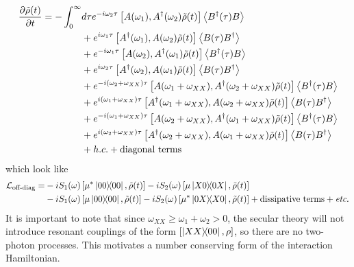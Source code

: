 \documentclass[]{article}
\begin{document}
\begin{align}
	\pdv{\tilde{\rho}(t)}{t} = - \int_{0}^{\infty}& d\tau e^{-i\omega_2 \tau} \left[A(\omega_1), A^{\dagger}(\omega_2)\tilde{\rho}(t)\right] \expval{B^{\dagger}(\tau)B} \\
	&+ e^{i\omega_1\tau} \left[A^{\dagger}(\omega_1), A(\omega_2)\tilde{\rho}(t)\right] \expval{B(\tau)B^{\dagger}} \\
	& + e^{-i\omega_1 \tau} \left[A(\omega_2), A^{\dagger}(\omega_1)\tilde{\rho}(t)\right] \expval{B^{\dagger}(\tau)B} \\
	&+ e^{i\omega_2\tau} \left[A^{\dagger}(\omega_2), A(\omega_1)\tilde{\rho}(t)\right] \expval{B(\tau)B^{\dagger}} \\
	& + e^{-i(\omega_2 +\omega_{XX} )\tau} \left[A(\omega_1 +\omega_{XX}), A^{\dagger}(\omega_2 +\omega_{XX})\tilde{\rho}(t)\right] \expval{B^{\dagger}(\tau)B} \\
	&+ e^{i(\omega_1 +\omega_{XX} )\tau} \left[A^{\dagger}(\omega_1 +\omega_{XX}), A(\omega_2 +\omega_{XX})\tilde{\rho}(t)\right] \expval{B(\tau)B^{\dagger}}\\
	& + e^{-i(\omega_1 +\omega_{XX} )\tau} \left[A(\omega_2 +\omega_{XX}), A^{\dagger}(\omega_1 +\omega_{XX})\tilde{\rho}(t)\right] \expval{B^{\dagger}(\tau)B} \\
	&+ e^{i(\omega_2 +\omega_{XX} )\tau} \left[A^{\dagger}(\omega_2 +\omega_{XX}), A(\omega_1 +\omega_{XX})\tilde{\rho}(t)\right] \expval{B(\tau)B^{\dagger}}\\
	&+ h.c. + \textnormal{diagonal terms}
\end{align}
which look like
\begin{align}
	\begin{split}
		\mathcal{L}_{\textnormal{off-diag}} = &-i S_1(\omega)\left[\mu^*\dyad{00},\tilde{\rho}(t)\right] - iS_2(\omega)\left[\mu\dyad{X0}{0X},\tilde{\rho}(t)\right]  \\&- i S_1(\omega)\left[\mu\dyad{00},\tilde{\rho}(t)\right] - iS_2(\omega)\left[\mu^*\dyad{0X}{X0},\tilde{\rho}(t)\right] + \textnormal{dissipative terms} + \textit{etc.}
	\end{split}
\end{align}
It is important to note that since $\omega_{XX}\geq \omega_{1}+\omega_{2}>0$, the secular theory will not introduce resonant couplings of the form $\left[\dyad{XX}{00}, \rho\right]$, so there are no two-photon processes. This motivates a number conserving form of the interaction Hamiltonian.
\end{document}
